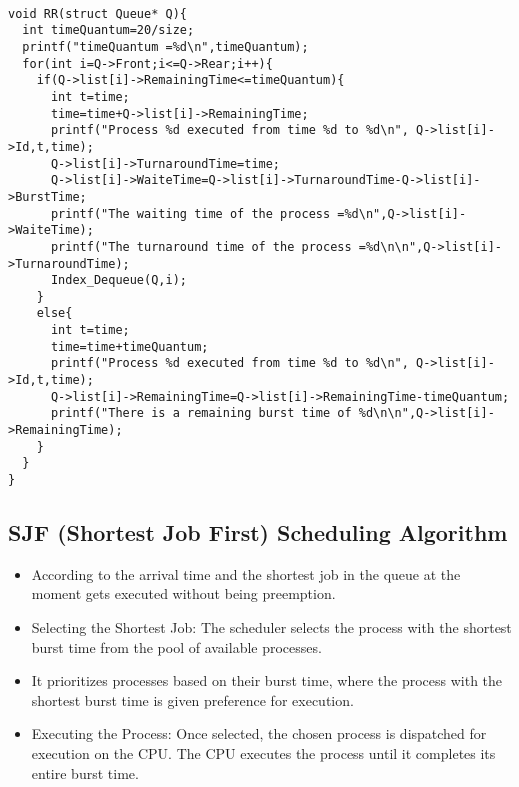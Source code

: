 \documentclass{article}
\begin{document}
\begin{lstlisting}[basicstyle=\footnotesize]

void RR(struct Queue* Q){ 
  int timeQuantum=20/size;
  printf("timeQuantum =%d\n",timeQuantum);
  for(int i=Q->Front;i<=Q->Rear;i++){
    if(Q->list[i]->RemainingTime<=timeQuantum){
      int t=time;
      time=time+Q->list[i]->RemainingTime;
      printf("Process %d executed from time %d to %d\n", Q->list[i]->Id,t,time);
      Q->list[i]->TurnaroundTime=time;
      Q->list[i]->WaiteTime=Q->list[i]->TurnaroundTime-Q->list[i]->BurstTime;
      printf("The waiting time of the process =%d\n",Q->list[i]->WaiteTime);
      printf("The turnaround time of the process =%d\n\n",Q->list[i]->TurnaroundTime);
      Index_Dequeue(Q,i);
    } 
    else{
      int t=time;
      time=time+timeQuantum;
      printf("Process %d executed from time %d to %d\n", Q->list[i]->Id,t,time);
      Q->list[i]->RemainingTime=Q->list[i]->RemainingTime-timeQuantum;
      printf("There is a remaining burst time of %d\n\n",Q->list[i]->RemainingTime);
    }   
  }
}
\end{lstlisting}

\newpage
\vspace{\baselineskip}
\subsection{SJF (Shortest Job First) Scheduling Algorithm}
\begin{itemize}
    \item According to the arrival time and the shortest job in the queue at the moment gets executed without being preemption.
    \item Selecting the Shortest Job: The scheduler selects the process with the shortest burst time from the pool of available processes.
    \item It prioritizes processes based on their burst time, where the process with the shortest burst time is given preference for execution.
    \item Executing the Process: Once selected, the chosen process is dispatched for execution on the CPU. The CPU executes the process until it completes its entire burst time.
\end{itemize}
\vspace{\baselineskip}
\end{document}
